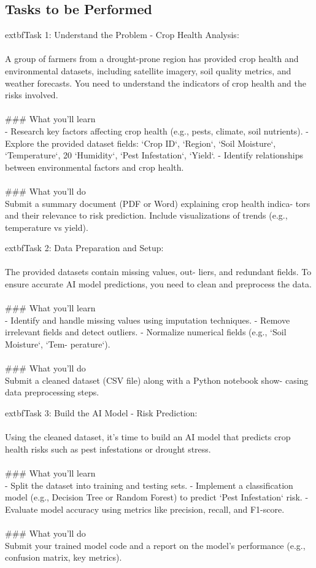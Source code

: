 \documentclass{article}
\begin{document}
\subsection*{Tasks to be Performed}
	extbf{Task 1:} Understand the Problem - Crop Health Analysis:  \\
 \\
 A group of farmers from a drought-prone region has provided crop health and environmental datasets, including satellite imagery, soil quality metrics, and weather forecasts. You need to understand the indicators of crop health and the risks involved. \\
 \\
### What you'll learn \\
- Research key factors affecting crop health (e.g., pests, climate, soil nutrients). - Explore the provided dataset fields: ‘Crop ID‘, ‘Region‘, ‘Soil Moisture‘, ‘Temperature‘, 20 ‘Humidity‘, ‘Pest Infestation‘, ‘Yield‘. - Identify relationships between environmental factors and crop health. \\
 \\
### What you'll do \\
Submit a summary document (PDF or Word) explaining crop health indica- tors and their relevance to risk prediction. Include visualizations of trends (e.g., temperature vs yield).

	extbf{Task 2:} Data Preparation and Setup:  \\
 \\
 The provided datasets contain missing values, out- liers, and redundant fields. To ensure accurate AI model predictions, you need to clean and preprocess the data. \\
 \\
### What you'll learn \\
- Identify and handle missing values using imputation techniques. - Remove irrelevant fields and detect outliers. - Normalize numerical fields (e.g., ‘Soil Moisture‘, ‘Tem- perature‘). \\
 \\
### What you'll do \\
Submit a cleaned dataset (CSV file) along with a Python notebook show- casing data preprocessing steps.

	extbf{Task 3:} Build the AI Model - Risk Prediction:  \\
 \\
 Using the cleaned dataset, it’s time to build an AI model that predicts crop health risks such as pest infestations or drought stress. \\
 \\
### What you'll learn \\
- Split the dataset into training and testing sets. - Implement a classification model (e.g., Decision Tree or Random Forest) to predict ‘Pest Infestation‘ risk. - Evaluate model accuracy using metrics like precision, recall, and F1-score. \\
 \\
### What you'll do \\
Submit your trained model code and a report on the model’s performance (e.g., confusion matrix, key metrics).
\end{document}
